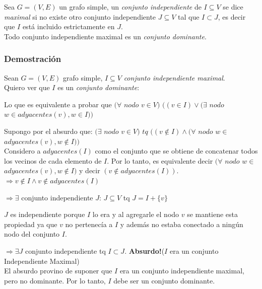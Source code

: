 Sea $G = (V, E)$ un grafo simple, un \emph{conjunto independiente} de $I \subseteq V$ se dice \emph{maximal} si no existe otro conjunto independiente $J \subseteq V$ tal que $I \subset J$, es decir que $I$ est\'a incluido estrictamente en $J$. \\
 
Todo conjunto independiente maximal es un \emph{conjunto dominante}.

\subsubsection*{Demostraci\'on}

Sean $G = (V, E)$ grafo simple, $I \subseteq V$ \emph{conjunto independiente maximal}.\\

Quiero ver que $I$ es un \emph{conjunto dominante}: 

Lo que es equivalente a probar que $(\forall $ $nodo$ $ v \in V)$ $((v \in I) \vee (\exists $ $nodo$ $ w \in adyacentes(v), w \in I))$

\bigskip
Supongo por el absurdo que: 
$(\exists $ $nodo$ $ v \in V)$ $tq$ $((v\notin I)\wedge(\forall $ $nodo$ $w \in $ $adyacentes(v), w\notin I))$\\

Considero a $adyacentes(I)$ como el conjunto que se obtiene de concatenar todos los vecinos de cada elemento de $I$. Por lo tanto, es equivalente decir $(\forall $ $nodo$ $w \in $ $adyacentes(v), w\notin I)$ y decir $( v \notin adyacentes(I))$.\\

$\Rightarrow v\notin I \wedge v \notin adyacentes(I)$ 

$\Rightarrow \exists$ conjunto independiente $J$: $J\subseteq V$ tq $J=I+\{v\}$

$J$ es independiente porque $I$ lo era y al agregarle el nodo $v$ se mantiene esta propiedad ya que $v$ no pertenec\'ia a $I$ y adem\'as no estaba conectado a ning\'un nodo del conjunto $I$.

$\Rightarrow \exists J$ conjunto independiente tq $I \subset J$. \textbf{Absurdo!}($I$ era un conjunto Independiente Maximal)\\

El absurdo provino de suponer que $I$ era un conjunto independiente maximal, pero no dominante. Por lo tanto, $I$ debe ser un conjunto dominante.







